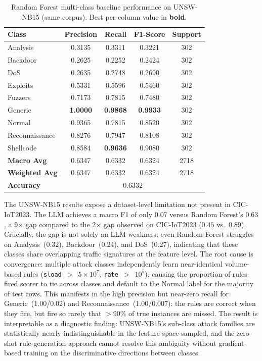 \begin{table}[htbp]
\centering
\caption{Random Forest multi-class baseline performance on UNSW-NB15
  (same corpus). Best per-column value in \textbf{bold}.}
\label{tab:multiclass_rf_unsw}
\begin{tabular}{lcccc}
\toprule
\textbf{Class} & \textbf{Precision} & \textbf{Recall} & \textbf{F1-Score} & \textbf{Support} \\
\midrule
Analysis       & 0.3135 & 0.3311 & 0.3221 & 302 \\
Backdoor       & 0.2625 & 0.2252 & 0.2424 & 302 \\
DoS            & 0.2635 & 0.2748 & 0.2690 & 302 \\
Exploits       & 0.5331 & 0.5596 & 0.5460 & 302 \\
Fuzzers        & 0.7173 & 0.7815 & 0.7480 & 302 \\
Generic        & \textbf{1.0000} & \textbf{0.9868} & \textbf{0.9933} & 302 \\
Normal         & 0.9365 & 0.7815 & 0.8520 & 302 \\
Reconnaissance & 0.8276 & 0.7947 & 0.8108 & 302 \\
Shellcode      & 0.8584 & \textbf{0.9636} & 0.9080 & 302 \\
\midrule
\textbf{Macro Avg}    & 0.6347 & 0.6332 & 0.6324 & 2718 \\
\textbf{Weighted Avg} & 0.6347 & 0.6332 & 0.6324 & 2718 \\
\textbf{Accuracy}     & \multicolumn{4}{c}{0.6332} \\
\bottomrule
\end{tabular}
\end{table}

The UNSW-NB15 results expose a dataset-level limitation not present in CIC-IoT2023.
The LLM achieves a macro F1 of only $0.07$ versus Random Forest's $0.63$, a 9$\times$
gap compared to the 2$\times$ gap observed on CIC-IoT2023 ($0.45$ vs.\ $0.89$).
Crucially, the gap is not solely an LLM weakness: even Random Forest struggles on
Analysis~(0.32), Backdoor~(0.24), and DoS~(0.27), indicating that these classes
share overlapping traffic signatures at the feature level.
The root cause is convergence: multiple attack classes independently learn near-identical
volume-based rules (\texttt{sload}~$>$~$5\times10^7$, \texttt{rate}~$>$~$10^5$),
causing the proportion-of-rules-fired scorer to tie across classes and default to the
Normal label for the majority of test rows.
This manifests in the high precision but near-zero recall for Generic~(1.00/0.02) and
Reconnaissance~(1.00/0.007): the rules are correct when they fire, but fire so rarely
that $>$90\% of true instances are missed.
The result is interpretable as a diagnostic finding: UNSW-NB15's sub-class attack
families are statistically nearly indistinguishable in the feature space sampled,
and the zero-shot rule-generation approach cannot resolve this ambiguity without
gradient-based training on the discriminative directions between classes.

